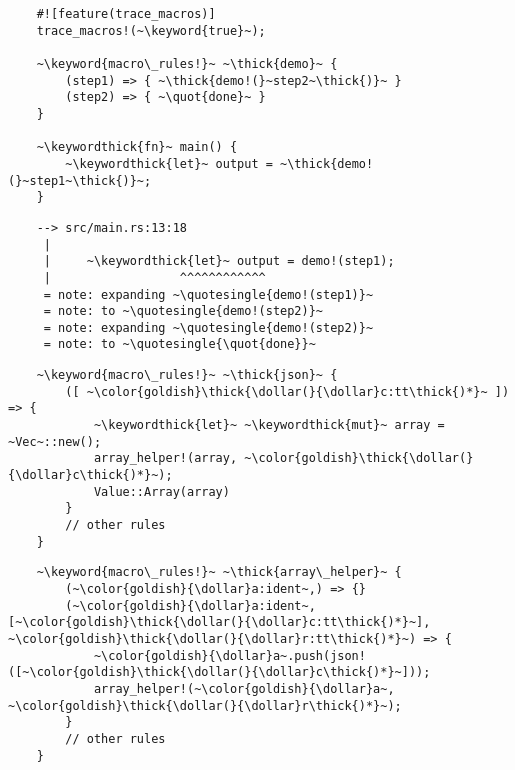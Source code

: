\documentclass[usepdftitle=false,aspectratio=169]{beamer}
\newcommand{\dollar}{\makebox[\widthof{\$}][c]{\$}}
\newcommand{\thick}[1]{\contourlength{0.16pt}\contour[10]{black}{#1}}
\newcommand{\slantbox}[2][.5]
  {%
    \mbox
      {%
        \sbox{\foobox}{#2}%
        \hskip\wd\foobox
        \pdfsave
        \pdfsetmatrix{1 0 #1 1}%
        \llap{\usebox{\foobox}}%
        \pdfrestore
      }%
  }
\newcommand{\backslantbox}[2][.5]
  {%
    \mbox
      {%
        \sbox{\foobox}{#2}%
        \hskip\wd\foobox
        \pdfsave
        \pdfsetmatrix{-1 0 #1 1}%
        \llap{\usebox{\foobox}}%
        \pdfrestore
      }%
  }
\newcommand{\openquote}{\backslantbox[.2]{\hspace{11pt}''\hspace{-11pt}}}
\newcommand{\closequote}{\slantbox[-.2]{\hspace{2pt}''\hspace{-2pt}}}
\newcommand{\openquotesingle}{\backslantbox[.2]{\hspace{11pt}'\hspace{-11pt}}}
\newcommand{\closequotesingle}{\slantbox[-.2]{\hspace{2pt}'\hspace{-2pt}}}
\newcommand{\blackquote}[1]{\openquote#1\closequote}
\newcommand{\quot}[1]{{\color{redish}\blackquote{#1}}}
\newcommand{\quotesingle}[1]{\openquotesingle#1\closequotesingle}
\newcommand{\keyword}[1]{\color{greenish}#1}
\newcommand{\keywordthick}[1]{\color{greenish}\contourlength{0.20pt}\contour[10]{greenish}{#1}}
\begin{document}

\begin{frame}
\end{frame}

\begin{frame}[fragile]
  \begin{verbatim}
    #![feature(trace_macros)]
    trace_macros!(~\keyword{true}~);

    ~\keyword{macro\_rules!}~ ~\thick{demo}~ {
        (step1) => { ~\thick{demo!(}~step2~\thick{)}~ }
        (step2) => { ~\quot{done}~ }
    }

    ~\keywordthick{fn}~ main() {
        ~\keywordthick{let}~ output = ~\thick{demo!(}~step1~\thick{)}~;
    }
  \end{verbatim}
\end{frame}

\begin{frame}[fragile]
  \begin{verbatim}
    --> src/main.rs:13:18
     |
     |     ~\keywordthick{let}~ output = demo!(step1);
     |                  ^^^^^^^^^^^^
     = note: expanding ~\quotesingle{demo!(step1)}~
     = note: to ~\quotesingle{demo!(step2)}~
     = note: expanding ~\quotesingle{demo!(step2)}~
     = note: to ~\quotesingle{\quot{done}}~
  \end{verbatim}
\end{frame}

\begin{frame}[fragile]
  \begin{verbatim}
    ~\keyword{macro\_rules!}~ ~\thick{json}~ {
        ([ ~\color{goldish}\thick{\dollar(}{\dollar}c:tt\thick{)*}~ ]) => {
            ~\keywordthick{let}~ ~\keywordthick{mut}~ array = ~Vec~::new();
            array_helper!(array, ~\color{goldish}\thick{\dollar(}{\dollar}c\thick{)*}~);
            Value::Array(array)
        }
        // other rules
    }
  \end{verbatim}
\end{frame}

\begin{frame}[fragile]
  \begin{verbatim}
    ~\keyword{macro\_rules!}~ ~\thick{array\_helper}~ {
        (~\color{goldish}{\dollar}a:ident~,) => {}
        (~\color{goldish}{\dollar}a:ident~, [~\color{goldish}\thick{\dollar(}{\dollar}c:tt\thick{)*}~], ~\color{goldish}\thick{\dollar(}{\dollar}r:tt\thick{)*}~) => {
            ~\color{goldish}{\dollar}a~.push(json!([~\color{goldish}\thick{\dollar(}{\dollar}c\thick{)*}~]));
            array_helper!(~\color{goldish}{\dollar}a~, ~\color{goldish}\thick{\dollar(}{\dollar}r\thick{)*}~);
        }
        // other rules
    }
  \end{verbatim}
\end{frame}
\end{document}
